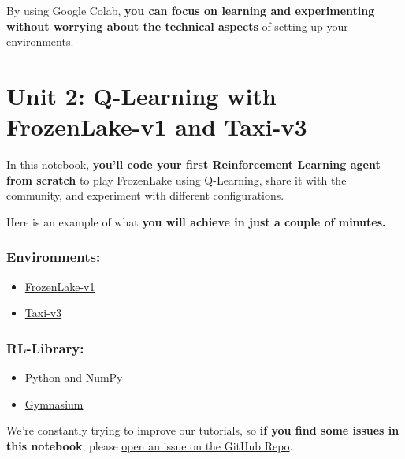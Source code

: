 \documentclass[11pt,a4paper]{article}
\begin{document}
By using Google Colab, \textbf{you can focus on learning and experimenting without worrying about the technical aspects} of setting up your environments.

\section{Unit 2: Q-Learning with FrozenLake-v1 and Taxi-v3}\label{unit-2-q-learning-with-frozenlake-v1-and-taxi-v3}


In this notebook, \textbf{you'll code your first Reinforcement Learning agent from scratch} to play FrozenLake using Q-Learning, share it with the community, and experiment with different configurations.

Here is an example of what \textbf{you will achieve in just a couple of minutes.}


\subsubsection{Environments:}\label{environments}

\begin{itemize}
\tightlist
\item
  \href{https://gymnasium.farama.org/environments/toy_text/frozen_lake/}{FrozenLake-v1}
\item
  \href{https://gymnasium.farama.org/environments/toy_text/taxi/}{Taxi-v3}
\end{itemize}

\subsubsection{RL-Library:}\label{rl-library}

\begin{itemize}
\tightlist
\item
  Python and NumPy
\item
  \href{https://gymnasium.farama.org/}{Gymnasium}
\end{itemize}

We're constantly trying to improve our tutorials, so \textbf{if you find some issues in this notebook}, please \href{https://github.com/huggingface/deep-rl-class/issues}{open an issue on the GitHub Repo}.
\end{document}
